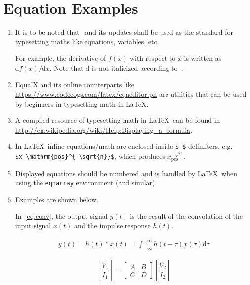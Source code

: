 \section{Equation Examples}

\begin{enumerate}
	\item It is to be noted that~\cite{ISO800002} and its updates shall be used as the standard for typesetting maths like equations, variables, etc. 
	
	\begin{description}
			For example, the derivative of $f \left( x \right)$ with respect to $x$ is written as $\mathrm{d} f \left( x \right)/\mathrm{d} x$.  Note that $\mathrm{d}$ is not italicized according to~\cite{ISO800002}.   
	\end{description}
		
	\item EqualX and its online counterparts like \url{https://www.codecogs.com/latex/eqneditor.ph} are utilities that can be used by beginners in typesetting math in \LaTeX. 
	
	\item A compiled resource of typesetting math in \LaTeX\ can be found in \url{http://en.wikipedia.org/wiki/Help:Displaying_a_formula}. 

	\item In \LaTeX\, inline equations/math are enclosed inside \verb|$ $| delimiters, e.g. \verb|$x_\mathrm{pos}^{-\sqrt{n}}$|, which produces $x_\mathrm{pos}^{-\sqrt{n}}$.  
	
	\item Displayed equations should be numbered and is handled by \LaTeX\ when using the \texttt{eqnarray} environment (and similar).
	
	\item Examples are shown below. 


  In~\eqref{eq:conv}, the output signal $y\left( t \right) $ is the result of the convolution of the input signal $x\left( t \right) $ 
and the impulse response $h\left( t \right) $.

\begin{eqnarray}   
     y\left( t \right) = h\left( t \right) * x\left( t \right)=\int_{-\infty}^{+\infty}h\left( t-\tau \right)x\left( \tau \right) \mathrm{d}\tau
	\label{eq:conv}
\end{eqnarray}






\begin{eqnarray}
	\left[ \dfrac{ V_{1} }{ I_{1} } \right] = 
	\begin{bmatrix}
		A & B \\ 
		C & D 
	\end{bmatrix} 
	\left[ \dfrac{ V_{2} }{ I_{2} } \right]
	\label{eq:ABCD}
\end{eqnarray}







\end{enumerate}
